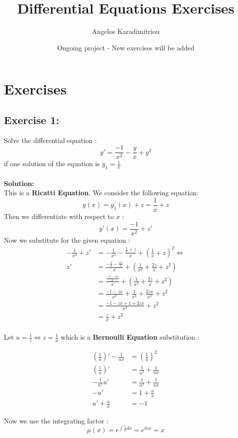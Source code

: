 \documentclass{article}
\title{Differential Equations Exercises}
\author{Angelos Karadimitriou}
\date{Ongoing project - New exercises will be added}
\begin{document}
\maketitle

\section{Exercises}
\subsection{Exercise 1:}
Solve the differential equation :
$$y' = \frac{-1}{x^2} - \frac{y}{x} + y^2 $$
if one solution of the equation is $y_1=\frac{1}{x}$
\\\\
\textbf{Solution:}
\\
This is a \textbf{Ricatti Equation}. We consider the following equation:
$$y(x) = y_1(x) + z = \frac{1}{x} + z$$
Then we differentiate with respect to $x$ :
$$y'(x) = \frac{-1}{x^2} + z'$$
Now we substitute for the given equation :
\begin{align*}
   -\frac{1}{x^2}+z' &= -\frac{1}{x^2}-\frac{\frac{1}{x}+z}{x}+\left(\frac{1}{x}+z\right)^2  \iff \\
z' &= \frac{-\frac{1}{x}-\frac{zx}{x}}{x}+\left(\frac{1}{x^2}+\frac{2z}{x}+z^2\right)  \\
&= \frac{\frac{-1-zx}{x}}{x}+\left(\frac{1}{x^2}+\frac{2z}{x}+z^2\right)  \\
&= \frac{-1-zx}{x^2}+\frac{1}{x^2}+\frac{2zx}{x^2}+z^2  \\
&= \frac{-1-zx+1+2zx}{x^2}+z^2  \\
&= \frac{z}{x}+z^2  \\
\end{align*}

Let $u = \frac{1}{z} \iff z = \frac{1}{u}$ which is a \textbf{Bernoulli Equation} substitution : 

\begin{align*}
    \left(\frac{1}{u}\right)'-\frac{1}{ux} &= \left(\frac{1}{u}\right)^2 \\
    \left(\frac{1}{u}\right)' &= \frac{1}{u^2}+\frac{1}{ux}  \\
    -\frac{1}{u^2}u' &= \frac{1}{u^2}+\frac{1}{ux}  \\
    -u' &= 1+\frac{u}{x} \\
    u'+\frac{u}{x} &= -1 
\end{align*}

Now we use the integrating factor : 
$$μ(x) = e^{\int\frac{1}{x}dx} = e^{lnx} = x $$
\end{document}
